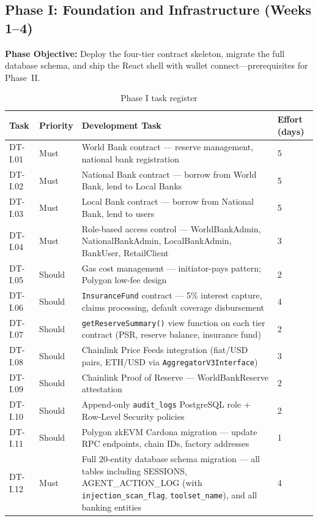 \documentclass[12pt, a4paper]{report}
\newcommand{\tableheadcolor}{\rowcolor{TableHeadBg}}
\begin{document}
\subsection{Phase I: Foundation and Infrastructure (Weeks 1--4)}

\textbf{Phase Objective:} Deploy the four-tier contract skeleton, migrate the full database schema, and ship the React shell with wallet connect---prerequisites for Phase~II.

\begin{table}[H]
\centering
\caption[Phase I task register]{Phase I task register}
\label{tab:phaseI-contracts}
\small
\begin{tabular}{p{1.8cm}p{1.8cm}p{7.5cm}p{1.5cm}}
\toprule
\tableheadcolor
\textbf{Task} & \textbf{Priority} & \textbf{Development Task} & \textbf{Effort (days)} \\
\midrule
DT-I.01 & Must & World Bank contract --- reserve management, national bank registration & 5 \\
DT-I.02 & Must & National Bank contract --- borrow from World Bank, lend to Local Banks & 5 \\
DT-I.03 & Must & Local Bank contract --- borrow from National Bank, lend to users & 5 \\
DT-I.04 & Must & Role-based access control --- WorldBankAdmin, NationalBankAdmin, LocalBankAdmin, BankUser, RetailClient & 3 \\
DT-I.05 & Should & Gas cost management --- initiator-pays pattern; Polygon low-fee design & 2 \\
DT-I.06 & Should & \texttt{InsuranceFund} contract --- 5\% interest capture, claims processing, default coverage disbursement & 4 \\
DT-I.07 & Should & \texttt{getReserveSummary()} view function on each tier contract (PSR, reserve balance, insurance fund) & 2 \\
DT-I.08 & Should & Chainlink Price Feeds integration (fiat/USD pairs, ETH/USD via \texttt{AggregatorV3Interface}) & 3 \\
DT-I.09 & Should & Chainlink Proof of Reserve --- WorldBankReserve attestation & 2 \\
DT-I.10 & Should & Append-only \texttt{audit\_logs} PostgreSQL role + Row-Level Security policies & 2 \\
DT-I.11 & Should & Polygon zkEVM Cardona migration --- update RPC endpoints, chain IDs, factory addresses & 1 \\
DT-I.12 & Must & Full 20-entity database schema migration --- all tables including SESSIONS, AGENT\_ACTION\_LOG (with \texttt{injection\_scan\_flag}, \texttt{toolset\_name}), and all banking entities & 4 \\

\end{tabular}
\end{table}
\end{document}
